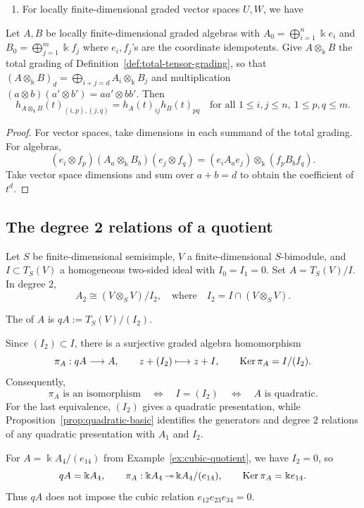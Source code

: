 \begin{lemma}\label{lem:hilbert-field-tensor}
\begin{enumerate}
\item For locally finite-dimensional graded vector spaces $U,W$, we have 
\end{enumerate}
Let $A,B$ be locally finite-dimensional graded algebras with $A_0=\bigoplus_{i=1}^n\Bbbk e_i$ and $B_0=\bigoplus_{j=1}^m\Bbbk f_j$ where $e_i, f_j$'s are the coordinate idempotents.
Give $A\otimes_\Bbbk B$ the total grading of Definition~\ref{def:total-tensor-grading}, so that $(A\otimes_\Bbbk B)_d=\bigoplus_{i+j=d}A_i\otimes_\Bbbk B_j$ and multiplication
$(a\otimes b)(a'\otimes b')=aa'\otimes bb'$.
Then
\[
h_{A\otimes_\Bbbk B}(t)_{(i,p),(j,q)}
=h_A(t)_{ij}h_B(t)_{pq}
\quad\text{for all }1\leq i,j\leq n,\ 1\leq p,q\leq m.
\]
\end{lemma}
\begin{proof}
For vector spaces, take dimensions in each summand of the total grading.
For algebras,
\[
(e_i\otimes f_p)(A_a\otimes_\Bbbk B_b)(e_j\otimes f_q)
=(e_iA_ae_j)\otimes_\Bbbk(f_pB_bf_q).
\]
Take vector space dimensions and sum over $a+b=d$ to obtain the coefficient of $t^d$.
\end{proof}




\begin{advanced}[suppressfirstparskip=true,innertopmargin=0pt]
\subsection{The degree 2 relations of a quotient}

Let $S$ be finite-dimensional semisimple, $V$ a finite-dimensional $S$-bimodule, and $I\subset T_S(V)$ a homogeneous two-sided ideal with $I_0=I_1=0$.
Set $A=T_S(V)/I$.
In degree $2$,
\[
A_2\cong(V\otimes_S V)/I_2,
\quad\text{where}\quad
I_2=I\cap(V\otimes_S V).
\]

\begin{definition}\label{def:quadratic-part}
The  of $A$ is $qA:=T_S(V)/(I_2)$.
\end{definition}

Since $(I_2)\subset I$, there is a surjective graded algebra homomorphism
\[
\pi_A:qA\longrightarrow A,\qquad z+(I_2)\longmapsto z+I,
\qquad \operatorname{Ker}\nolimits\pi_A=I/(I_2).
\]
Consequently,
\[
\pi_A\text{ is an isomorphism}
\quad\Longleftrightarrow\quad I=(I_2)
\quad\Longleftrightarrow\quad A\text{ is quadratic}.
\]
For the last equivalence, $(I_2)$ gives a quadratic presentation, while Proposition~\ref{prop:quadratic-basic} identifies the generators and degree $2$ relations of any quadratic presentation with $A_1$ and $I_2$.

\begin{example}
For $A=\Bbbk A_4/(e_{14})$ from Example~\ref{ex:cubic-quotient}, we have $I_2=0$, so
\[
qA=\Bbbk A_4,\qquad
\pi_A:\Bbbk A_4\operatorname{\twoheadrightarrow}\Bbbk A_4/(e_{14}),\qquad
\operatorname{Ker}\nolimits\pi_A=\Bbbk e_{14}.
\]
Thus $qA$ does not impose the cubic relation $e_{12}e_{23}e_{34}=0$.
\end{example}
\end{advanced}

